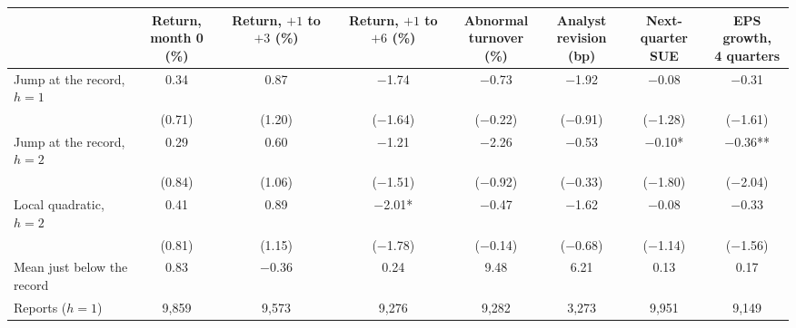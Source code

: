 \begin{tabular}{lccccccc}
\toprule
 & \shortstack{Return,\\ month 0 (\%)} & \shortstack{Return,\\ $+1$ to $+3$ (\%)} & \shortstack{Return,\\ $+1$ to $+6$ (\%)} & \shortstack{Abnormal\\ turnover (\%)} & \shortstack{Analyst\\ revision (bp)} & \shortstack{Next-quarter\\ SUE} & \shortstack{EPS growth,\\ 4 quarters}\\
\midrule
Jump at the record, $h=1$ & 0.34 & 0.87 & \ensuremath{-}1.74 & \ensuremath{-}0.73 & \ensuremath{-}1.92 & \ensuremath{-}0.08 & \ensuremath{-}0.31\\
 & (0.71) & (1.20) & (\ensuremath{-}1.64) & (\ensuremath{-}0.22) & (\ensuremath{-}0.91) & (\ensuremath{-}1.28) & (\ensuremath{-}1.61)\\[1pt]
Jump at the record, $h=2$ & 0.29 & 0.60 & \ensuremath{-}1.21 & \ensuremath{-}2.26 & \ensuremath{-}0.53 & \ensuremath{-}0.10* & \ensuremath{-}0.36**\\
 & (0.84) & (1.06) & (\ensuremath{-}1.51) & (\ensuremath{-}0.92) & (\ensuremath{-}0.33) & (\ensuremath{-}1.80) & (\ensuremath{-}2.04)\\[1pt]
Local quadratic, $h=2$ & 0.41 & 0.89 & \ensuremath{-}2.01* & \ensuremath{-}0.47 & \ensuremath{-}1.62 & \ensuremath{-}0.08 & \ensuremath{-}0.33\\
 & (0.81) & (1.15) & (\ensuremath{-}1.78) & (\ensuremath{-}0.14) & (\ensuremath{-}0.68) & (\ensuremath{-}1.14) & (\ensuremath{-}1.56)\\[1pt]
\midrule
Mean just below the record & 0.83 & \ensuremath{-}0.36 & 0.24 & 9.48 & 6.21 & 0.13 & 0.17\\
Reports ($h=1$) & 9,859 & 9,573 & 9,276 & 9,282 & 3,273 & 9,951 & 9,149\\
\bottomrule
\end{tabular}
